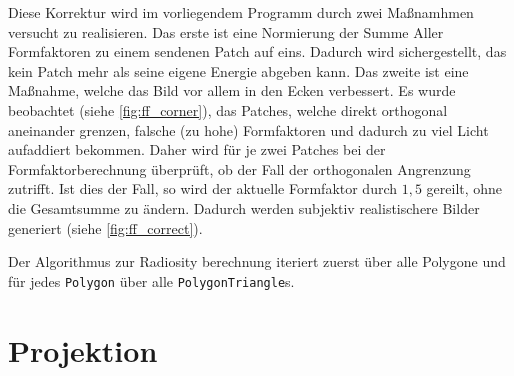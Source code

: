 \documentclass[final,a4paper,11pt,notitlepage,halfparskip]{scrreprt}
\begin{document}
Diese Korrektur wird im vorliegendem Programm durch zwei Maßnamhmen versucht zu
realisieren. Das erste ist eine Normierung der Summe Aller Formfaktoren zu einem
sendenen Patch auf eins. Dadurch wird sichergestellt, das kein Patch mehr als
seine eigene Energie abgeben kann. Das zweite ist eine Maßnahme, welche das Bild
vor allem in den Ecken verbessert. Es wurde beobachtet (siehe \ref{fig:ff_corner}), 
das Patches, welche direkt orthogonal aneinander grenzen, falsche (zu hohe) 
Formfaktoren und dadurch zu viel Licht aufaddiert bekommen. Daher wird für je
zwei Patches bei der Formfaktorberechnung überprüft, ob der Fall der
orthogonalen Angrenzung zutrifft. Ist dies der Fall, so wird der aktuelle
Formfaktor durch $1,5$ gereilt, ohne die Gesamtsumme zu ändern. Dadurch werden
subjektiv realistischere Bilder generiert (siehe \ref{fig:ff_correct}). 

Der Algorithmus zur Radiosity berechnung iteriert zuerst über alle Polygone und
für jedes \texttt{Polygon} über alle \texttt{PolygonTriangle}s. 

\section{Projektion}\label{sec:proj}
\end{document}
